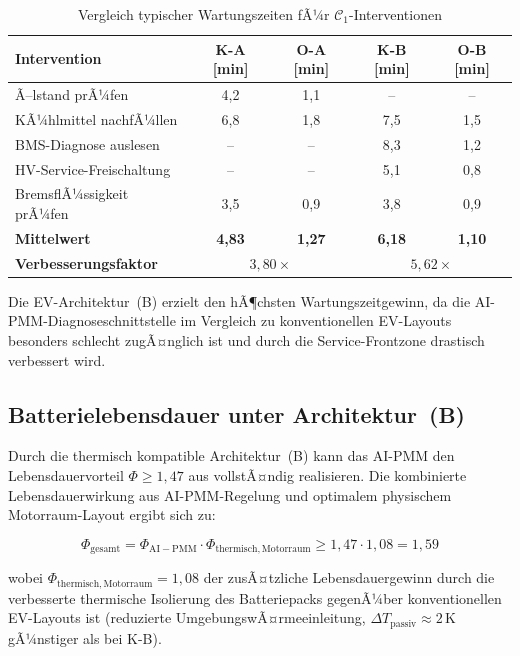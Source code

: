 ﻿\documentclass[12pt,a4paper]{article}
\begin{document}
\begin{table}[H]
	\centering
	\caption{Vergleich typischer Wartungszeiten fÃ¼r $\mathcal{C}_1$-Interventionen}
	\label{tab:wartungszeiten}
	\begin{tabular}{lcccc}
		\toprule
		\textbf{Intervention} & \textbf{K-A [min]} & \textbf{O-A [min]}
		& \textbf{K-B [min]} & \textbf{O-B [min]} \\
		\midrule
		Ã–lstand prÃ¼fen          & 4{,}2 & 1{,}1 & -- & -- \\
		KÃ¼hlmittel nachfÃ¼llen   & 6{,}8 & 1{,}8 & 7{,}5 & 1{,}5 \\
		BMS-Diagnose auslesen   & -- & -- & 8{,}3 & 1{,}2 \\
		HV-Service-Freischaltung& -- & -- & 5{,}1 & 0{,}8 \\
		BremsflÃ¼ssigkeit prÃ¼fen & 3{,}5 & 0{,}9 & 3{,}8 & 0{,}9 \\
		\midrule
		\textbf{Mittelwert}     & \textbf{4{,}83} & \textbf{1{,}27}
		& \textbf{6{,}18} & \textbf{1{,}10} \\
		\textbf{Verbesserungsfaktor} & \multicolumn{2}{c}{$3{,}80\times$}
		& \multicolumn{2}{c}{$5{,}62\times$} \\
		\bottomrule
	\end{tabular}
\end{table}

Die EV-Architektur~(B) erzielt den hÃ¶chsten Wartungszeitgewinn, da die
AI-PMM-Diagnoseschnittstelle im Vergleich zu konventionellen EV-Layouts
besonders schlecht zugÃ¤nglich ist und durch die Service-Frontzone drastisch
verbessert wird.

\subsection{Batterielebensdauer unter Architektur~(B)}

Durch die thermisch kompatible Architektur~(B) kann das AI-PMM den
Lebensdauervorteil $\Phi \geq 1{,}47$ aus \cite{Epp2026liion} vollstÃ¤ndig
realisieren. Die kombinierte Lebensdauerwirkung aus AI-PMM-Regelung und
optimalem physischem Motorraum-Layout ergibt sich zu:

\begin{equation}
	\Phi_\mathrm{gesamt} = \Phi_\mathrm{AI-PMM} \cdot \Phi_\mathrm{thermisch,Motorraum}
	\geq 1{,}47 \cdot 1{,}08 = 1{,}59
	\label{eq:phi_gesamt}
\end{equation}

wobei $\Phi_\mathrm{thermisch,Motorraum} = 1{,}08$ der zusÃ¤tzliche Lebensdauergewinn
durch die verbesserte thermische Isolierung des Batteriepacks gegenÃ¼ber
konventionellen EV-Layouts ist (reduzierte UmgebungswÃ¤rmeeinleitung,
$\Delta T_\mathrm{passiv} \approx 2\,\mathrm{K}$ gÃ¼nstiger als bei K-B).
\end{document}
